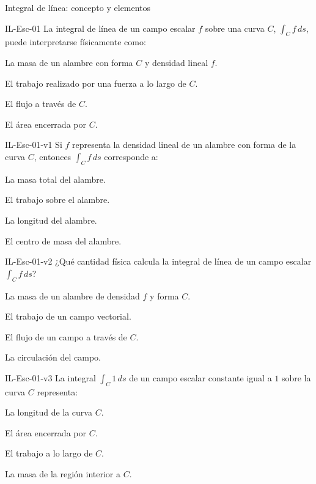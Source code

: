 \documentclass[a4,11pt]{aleph-notas}
\begin{document}
\begin{quiz}{Integral de línea: concepto y elementos}

\begin{multi}[]%
    {IL-Esc-01}
    La integral de línea de un campo escalar $f$ sobre una curva $C$, $\displaystyle\int_C f\,ds$, puede interpretarse físicamente como:
    \item* La masa de un alambre con forma $C$ y densidad lineal $f$.
    \item El trabajo realizado por una fuerza a lo largo de $C$.
    \item El flujo a través de $C$.
    \item El área encerrada por $C$.
\end{multi}

\begin{multi}[]%
    {IL-Esc-01-v1}
    Si $f$ representa la densidad lineal de un alambre con forma de la curva $C$, entonces $\displaystyle\int_C f\,ds$ corresponde a:
    \item* La masa total del alambre.
    \item El trabajo sobre el alambre.
    \item La longitud del alambre.
    \item El centro de masa del alambre.
\end{multi}

\begin{multi}[]%
    {IL-Esc-01-v2}
    ¿Qué cantidad física calcula la integral de línea de un campo escalar $\displaystyle\int_C f\,ds$?
    \item* La masa de un alambre de densidad $f$ y forma $C$.
    \item El trabajo de un campo vectorial.
    \item El flujo de un campo a través de $C$.
    \item La circulación del campo.
\end{multi}

\begin{multi}[]%
    {IL-Esc-01-v3}
    La integral $\displaystyle\int_C 1\,ds$ de un campo escalar constante igual a $1$ sobre la curva $C$ representa:
    \item* La longitud de la curva $C$.
    \item El área encerrada por $C$.
    \item El trabajo a lo largo de $C$.
    \item La masa de la región interior a $C$.
\end{multi}


\end{quiz}
\end{document}
